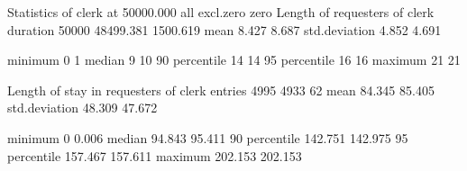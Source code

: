 \documentclass[letterpaper,10pt,english]{sphinxmanual}
\begin{document}
%
\begin{sphinxVerbatim}[commandchars=\\\{\}]
Statistics of clerk at     50000.000
                                                                     all    excl.zero         zero
\PYGZhy{}\PYGZhy{}\PYGZhy{}\PYGZhy{}\PYGZhy{}\PYGZhy{}\PYGZhy{}\PYGZhy{}\PYGZhy{}\PYGZhy{}\PYGZhy{}\PYGZhy{}\PYGZhy{}\PYGZhy{}\PYGZhy{}\PYGZhy{}\PYGZhy{}\PYGZhy{}\PYGZhy{}\PYGZhy{}\PYGZhy{}\PYGZhy{}\PYGZhy{}\PYGZhy{}\PYGZhy{}\PYGZhy{}\PYGZhy{}\PYGZhy{}\PYGZhy{}\PYGZhy{}\PYGZhy{}\PYGZhy{}\PYGZhy{}\PYGZhy{}\PYGZhy{}\PYGZhy{}\PYGZhy{}\PYGZhy{}\PYGZhy{}\PYGZhy{}\PYGZhy{}\PYGZhy{}\PYGZhy{}\PYGZhy{} \PYGZhy{}\PYGZhy{}\PYGZhy{}\PYGZhy{}\PYGZhy{}\PYGZhy{}\PYGZhy{}\PYGZhy{}\PYGZhy{}\PYGZhy{}\PYGZhy{}\PYGZhy{}\PYGZhy{}\PYGZhy{} \PYGZhy{}\PYGZhy{}\PYGZhy{}\PYGZhy{}\PYGZhy{}\PYGZhy{}\PYGZhy{}\PYGZhy{}\PYGZhy{}\PYGZhy{}\PYGZhy{}\PYGZhy{} \PYGZhy{}\PYGZhy{}\PYGZhy{}\PYGZhy{}\PYGZhy{}\PYGZhy{}\PYGZhy{}\PYGZhy{}\PYGZhy{}\PYGZhy{}\PYGZhy{}\PYGZhy{} \PYGZhy{}\PYGZhy{}\PYGZhy{}\PYGZhy{}\PYGZhy{}\PYGZhy{}\PYGZhy{}\PYGZhy{}\PYGZhy{}\PYGZhy{}\PYGZhy{}\PYGZhy{}
Length of requesters of clerk                duration          50000        48499.381     1500.619
                                             mean                  8.427        8.687
                                             std.deviation         4.852        4.691

                                             minimum               0            1
                                             median                9           10
                                             90\PYGZpc{} percentile       14           14
                                             95\PYGZpc{} percentile       16           16
                                             maximum              21           21

Length of stay in requesters of clerk        entries            4995         4933           62
                                             mean                 84.345       85.405
                                             std.deviation        48.309       47.672

                                             minimum               0            0.006
                                             median               94.843       95.411
                                             90\PYGZpc{} percentile      142.751      142.975
                                             95\PYGZpc{} percentile      157.467      157.611
                                             maximum             202.153      202.153


\end{sphinxVerbatim}
\end{document}
